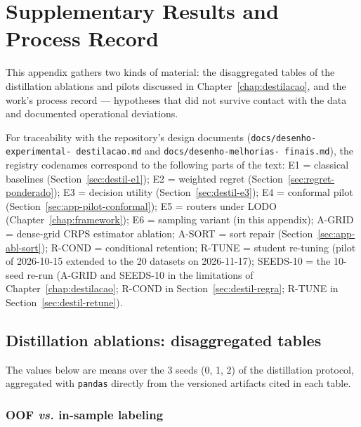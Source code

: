 \chapter{Supplementary Results and Process Record}
\label{app:suplementares}

This appendix gathers two kinds of material: the disaggregated tables
of the distillation ablations and pilots discussed in
Chapter~\ref{chap:destilacao}, and the work's process record ---
hypotheses that did not survive contact with the data and documented
operational deviations.

For traceability with the repository's design documents
(\texttt{docs/\allowbreak desenho-\allowbreak experimental-\allowbreak
destilacao.\allowbreak md}
and
\texttt{docs/\allowbreak desenho-\allowbreak melhorias-\allowbreak
finais.\allowbreak md}),
the registry codenames correspond to the following parts of the text:
E1 = classical baselines (Section~\ref{sec:destil-e1}); E2 = weighted
regret (Section~\ref{sec:regret-ponderado}); E3 = decision utility
(Section~\ref{sec:destil-e3}); E4 = conformal pilot
(Section~\ref{sec:app-pilot-conformal}); E5 = routers under LODO
(Chapter~\ref{chap:framework}); E6 = sampling variant (in this
appendix); A-GRID = dense-grid CRPS estimator ablation; A-SORT =
sort repair (Section~\ref{sec:app-abl-sort}); R-COND = conditional
retention; R-TUNE = student re-tuning (pilot of 2026-10-15 extended to the
20 datasets on 2026-11-17); SEEDS-10 = the 10-seed re-run (A-GRID and
SEEDS-10 in the limitations of Chapter~\ref{chap:destilacao}; R-COND
in Section~\ref{sec:destil-regra}; R-TUNE in
Section~\ref{sec:destil-retune}).

\section{Distillation ablations: disaggregated tables}
\label{sec:suple-ablacoes}

The values below are means over the 3 seeds (0, 1, 2) of the
distillation protocol, aggregated with \texttt{pandas} directly from
the versioned artifacts cited in each table.

\subsection{OOF \emph{vs.} in-sample labeling}


